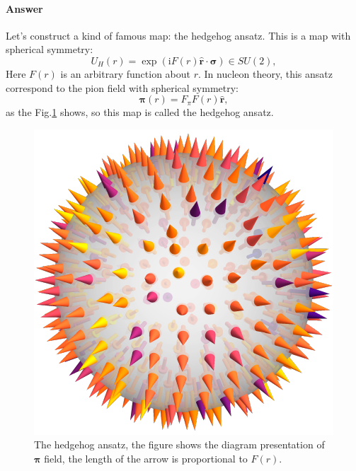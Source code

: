 \documentclass{book}
\begin{document}
\paragraph{Answer}
Let's construct a kind of famous map: the hedgehog ansatz. This is a map with spherical symmetry:
\begin{equation*}
U_{H}( r) =\exp(\mathrm{i} F( r)\hat{\boldsymbol{r}} \cdot \boldsymbol{\sigma }) \in SU( 2) ,
\end{equation*}
Here $F( r)$ is an arbitrary function about $r$. In nucleon theory, this ansatz correspond to the pion field with spherical symmetry:
\begin{equation*}
\boldsymbol{\pi }( r) =F_{\pi } F( r)\hat{\boldsymbol{r}} ,
\end{equation*}
as the Fig.\ref{fig:hedgehog} shows, so this map is called the hedgehog ansatz. 
\begin{figure}[h!]
\centering
\includegraphics{hedgehog.pdf}
\caption{The hedgehog ansatz, the figure shows the diagram presentation of $\boldsymbol{\pi }$ field, the length of the arrow is proportional to $F( r)$.}
\label{fig:hedgehog}
\end{figure}
\end{document}
